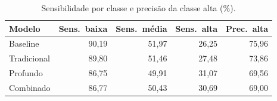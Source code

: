 \begin{table}[H]\centering\small
\caption{Sensibilidade por classe e precisão da classe alta (\%).}\label{tab:classes_final}
\begin{tabular}{lrrrr}\toprule
Modelo & Sens.\ baixa & Sens.\ média & Sens.\ alta & Prec.\ alta \\\midrule
Baseline & 90,19 & 51,97 & 26,25 & 75,96 \\
Tradicional & 89,80 & 51,46 & 27,48 & 73,86 \\
Profundo & 86,75 & 49,91 & 31,07 & 69,56 \\
Combinado & 86,77 & 50,43 & 30,69 & 69,00 \\\bottomrule
\end{tabular}
\end{table}

